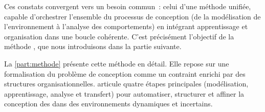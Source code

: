 \medskip

\noindent
Ces constats convergent vers un besoin commun~: celui d'une méthode unifiée, capable d'orchestrer l'ensemble du processus de conception (de la modélisation de l'environnement à l'analyse des comportements) en intégrant apprentissage et organisation dans une boucle cohérente. C'est précisément l'objectif de la méthode , que nous introduisons dans la partie suivante.

\noindent
La \autoref{part:methode} présente cette méthode en détail. Elle repose sur une formalisation du problème de conception comme un  contraint enrichi par des structures organisationnelles.  articule quatre étapes principales (modélisation, apprentissage, analyse et transfert) pour automatiser, structurer et affiner la conception des  dans des environnements dynamiques et incertains.
